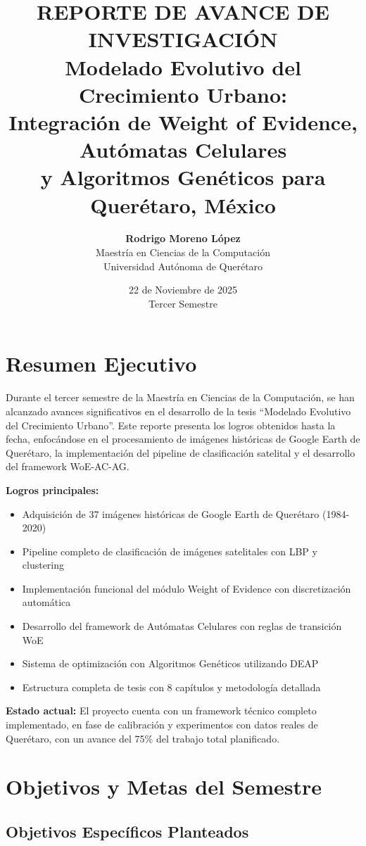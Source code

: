 \documentclass[12pt,letterpaper]{article}
\title{\textbf{\color{UAQBlue}REPORTE DE AVANCE DE INVESTIGACIÓN}\\[0.5cm]
       \Large Modelado Evolutivo del Crecimiento Urbano:\\
       Integración de Weight of Evidence, Autómatas Celulares\\
       y Algoritmos Genéticos para Querétaro, México}
\author{\textbf{Rodrigo Moreno López}\\
        Maestría en Ciencias de la Computación\\
        Universidad Autónoma de Querétaro}
\date{22 de Noviembre de 2025\\Tercer Semestre}
\begin{document}
\maketitle
\thispagestyle{empty}

\newpage
\tableofcontents
\newpage

\section{Resumen Ejecutivo}

Durante el tercer semestre de la Maestría en Ciencias de la Computación, se han alcanzado avances significativos en el desarrollo de la tesis ``Modelado Evolutivo del Crecimiento Urbano''. Este reporte presenta los logros obtenidos hasta la fecha, enfocándose en el procesamiento de imágenes históricas de Google Earth de Querétaro, la implementación del pipeline de clasificación satelital y el desarrollo del framework WoE-AC-AG.

\textbf{Logros principales:}
\begin{itemize}
\item Adquisición de 37 imágenes históricas de Google Earth de Querétaro (1984-2020)
\item Pipeline completo de clasificación de imágenes satelitales con LBP y clustering
\item Implementación funcional del módulo Weight of Evidence con discretización automática
\item Desarrollo del framework de Autómatas Celulares con reglas de transición WoE
\item Sistema de optimización con Algoritmos Genéticos utilizando DEAP
\item Estructura completa de tesis con 8 capítulos y metodología detallada
\end{itemize}

\textbf{Estado actual:} El proyecto cuenta con un framework técnico completo implementado, en fase de calibración y experimentos con datos reales de Querétaro, con un avance del 75\% del trabajo total planificado.

\section{Objetivos y Metas del Semestre}

\subsection{Objetivos Específicos Planteados}
\end{document}
